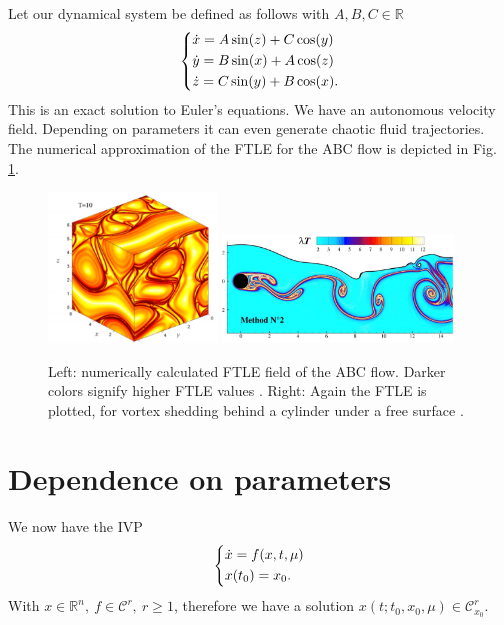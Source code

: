 \begin{ex}
	Let our dynamical system be defined as follows with $A,B,C \in \mathbb{R}$
\begin{align}
	\begin{dcases}
		\dot{x} = A \sin(z) + C \cos(y) \\
		\dot{y} = B \sin(x) + A \cos(z) \\
		\dot{z} = C \sin(y) + B \cos(x).
	\end{dcases}
\end{align}
This is an exact solution to Euler's equations.  We have an autonomous velocity field. Depending on parameters it can even generate chaotic fluid trajectories. The numerical approximation of the FTLE for the ABC flow is depicted in Fig. \ref{fig:FTLE_flows}.
\begin{figure}[h!]
	\centering
	\includegraphics[width=0.4\textwidth]{figures/ch1/14fluid1.png}
	\hspace{0.03\textwidth}
	\includegraphics[width=0.55\textwidth]{figures/ch1/15vortex_shedding.png}
	\caption{Left: numerically calculated FTLE field of the ABC flow. Darker colors signify higher FTLE values \cite{Haller2001}. Right: Again the FTLE is plotted, for vortex shedding behind a cylinder under a free surface \cite{Sun2016}.}
	\label{fig:FTLE_flows}
\end{figure}
\end{ex}
\vfill
\section{Dependence on parameters}
We now have the IVP
\begin{align}
	\begin{dcases}
		\dot{ {x}} = f( {x},t, {\mu} ) \\  {x}(t_0) =  {x}_0.
	\end{dcases}
\end{align}
With $ {x} \in \mathbb{R}^{n},\ f\in \mathcal{C}^r,\ r\geq 1$, therefore we have a solution $ {x}(t; t_0,  {x}_0,  {\mu} ) \in \mathcal{C}^r_{ {x}_0}$.

